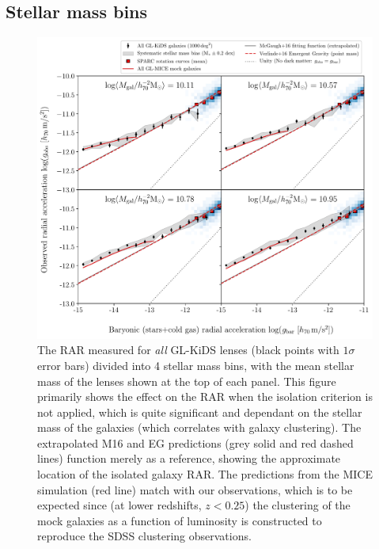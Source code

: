 \documentclass[usenatbib]{mnras}
\begin{document}
\subsection{Stellar mass bins}
\label{sec:results_Mstarbins}

\begin{figure}
	\includegraphics[width=\textwidth]{Figures/RAR_KiDS+MICE+Verlinde_4-massbins_all.pdf}
	\caption{The RAR measured for \emph{all} GL-KiDS lenses (black points with $1\sigma$ error bars) divided into 4 stellar mass bins, with the mean stellar mass of the lenses shown at the top of each panel. This figure primarily shows the effect on the RAR when the isolation criterion is not applied, which is quite significant and dependant on the stellar mass of the galaxies (which correlates with galaxy clustering). The extrapolated M16 and EG predictions (grey solid and red dashed lines) function merely as a reference, showing the approximate location of the isolated galaxy RAR. The predictions from the MICE simulation (red line) match with our observations, which is to be expected since (at lower redshifts, $z<0.25$) the clustering of the mock galaxies as a function of luminosity is constructed to reproduce the SDSS clustering observations.}
	\label{fig:RAR_kids_mice_mstarbins_all}
\end{figure}
\end{document}
